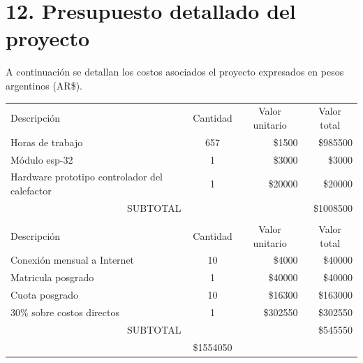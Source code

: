 \documentclass[
11pt, %
codirector, %
]{charter}
\begin{document}
\pagebreak
\section{12. Presupuesto detallado del proyecto}
\label{sec:presupuesto}

A continuación se detallan los costos asociados el proyecto expresados en pesos argentinos (AR\$).

\begin{table}[htpb]
\centering
\begin{tabularx}{\linewidth}{@{}|X|c|r|r|@{}}
\hline
\rowcolor[HTML]{C0C0C0} 
\multicolumn{4}{|c|}{\cellcolor[HTML]{C0C0C0}COSTOS DIRECTOS} \\ \hline
\rowcolor[HTML]{C0C0C0} 
Descripción &
  \multicolumn{1}{c|}{\cellcolor[HTML]{C0C0C0}Cantidad} &
  \multicolumn{1}{c|}{\cellcolor[HTML]{C0C0C0}Valor unitario} &
  \multicolumn{1}{c|}{\cellcolor[HTML]{C0C0C0}Valor total} \\ \hline

  Horas de trabajo &
  657 &
  \$1500 &
  \$985500 \\ \hline
 
  Módulo esp-32 &
  1 &
  \$3000 &
\$3000\\ \hline
 Hardware prototipo controlador del calefactor &
  1 &
  \$20000 &
\$20000 \\ \hline

\multicolumn{3}{|c|}{SUBTOTAL} &
  \$1008500 \\ \hline
\rowcolor[HTML]{C0C0C0} 
\multicolumn{4}{|c|}{\cellcolor[HTML]{C0C0C0}COSTOS INDIRECTOS} \\ \hline
\rowcolor[HTML]{C0C0C0} 
Descripción &
  \multicolumn{1}{c|}{\cellcolor[HTML]{C0C0C0}Cantidad} &
  \multicolumn{1}{c|}{\cellcolor[HTML]{C0C0C0}Valor unitario} &
  \multicolumn{1}{c|}{\cellcolor[HTML]{C0C0C0}Valor total} \\ \hline
\multicolumn{1}{|l|}{Conexión mensual a Internet} &10
   & \$4000
   &\$40000
   \\ \hline
   \multicolumn{1}{|l|}{Matricula posgrado } &1
   & \$40000
   &\$40000
   \\ \hline
     \multicolumn{1}{|l|}{Cuota posgrado } &10
   & \$16300
   &\$163000
    \\ \hline
     \multicolumn{1}{|l|}{30\% sobre costos directos } &1
   & \$302550
   &\$302550
   \\ \hline

\multicolumn{3}{|c|}{SUBTOTAL} &
  \$545550 \\ \hline
\rowcolor[HTML]{C0C0C0}
\multicolumn{3}{|c|}{TOTAL} &\$1554050
   \\ \hline
\end{tabularx}
\end{table}
\end{document}
